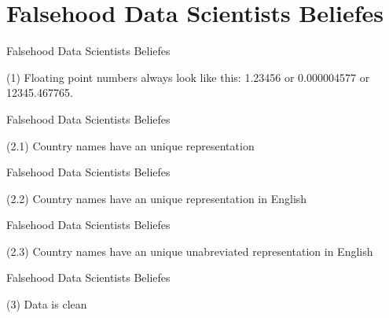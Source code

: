 \documentclass{beamer}
\begin{document}
\section{Falsehood Data Scientists Beliefes}
\begin{frame}{Falsehood Data Scientists Beliefes}
\begin{centering}
(1) Floating point numbers always look like this: 1.23456 or 0.000004577 or 12345.467765.
\end{centering}

\end{frame}

\begin{frame}{Falsehood Data Scientists Beliefes}
\begin{centering}
(2.1) Country names have an unique representation
\end{centering}

\end{frame}

\begin{frame}{Falsehood Data Scientists Beliefes}
\begin{centering}
(2.2) Country names have an unique representation in English
\end{centering}

\end{frame}

\begin{frame}{Falsehood Data Scientists Beliefes}
\begin{centering}
(2.3) Country names have an unique unabreviated representation in English
\end{centering}

\end{frame}

\begin{frame}{Falsehood Data Scientists Beliefes}
\begin{centering}
(3) Data is clean
\end{centering}

\end{frame}
\end{document}
